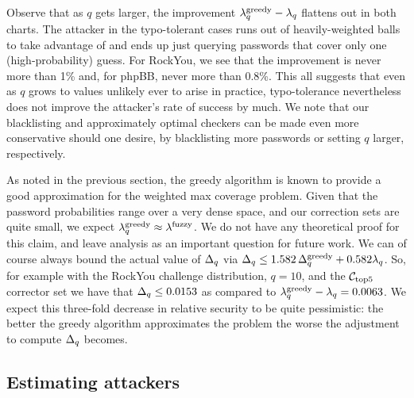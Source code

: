Observe that as $q$ gets larger, the improvement
$\lambda^\textnormal{greedy}_q - \lambda_q$ flattens out in both charts. The
attacker in the typo-tolerant cases runs out of heavily-weighted balls
to take advantage of and ends up just querying passwords that cover
only one (high-probability) guess. For RockYou, we see that the
improvement is never more than 1\% and, for phpBB, never
more than 0.8\%.  This all suggests that even as $q$ grows to values
unlikely ever to arise in practice, typo-tolerance nevertheless does
not improve the attacker's rate of success by much. We note that our
blacklisting and approximately optimal checkers can be made even more
conservative should one desire, by blacklisting more passwords or
setting $q$ larger, respectively.

As noted in the previous section, 
the greedy algorithm is known to provide a
good approximation for the weighted max coverage problem. Given that
the password probabilities range over a very dense space, and our
correction sets are quite small, we expect
$\lambda^\textnormal{greedy}_q \approx \lambda^\textnormal{fuzzy}$. We do not have any theoretical
proof for this claim, and leave analysis as an important question for future
work.  We can of course always bound the actual value of $\Delta_q$ via
$\Delta_q\le 1.582\,\Delta^\textnormal{greedy}_q + 0.582\lambda_q$. So, for example with 
the RockYou challenge distribution, $q=10$, and the ${\mathcal C}_{\textrm{top5}}$ corrector
set we have that $\Delta_q\le 0.0153$ as compared to $\lambda^\textnormal{greedy}_q -
\lambda_q = 0.0063$. We expect this three-fold decrease in relative security to be
quite pessimistic: the better the greedy algorithm approximates the problem the
worse the adjustment to compute $\Delta_q$ becomes.








\subsection{Estimating attackers}

